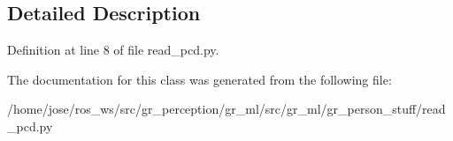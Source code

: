 \subsection{Detailed Description}


Definition at line 8 of file read\+\_\+pcd.\+py.



The documentation for this class was generated from the following file\+:\begin{DoxyCompactItemize}
\item 
/home/jose/ros\+\_\+ws/src/gr\+\_\+perception/gr\+\_\+ml/src/gr\+\_\+ml/gr\+\_\+person\+\_\+stuff/read\+\_\+pcd.\+py\end{DoxyCompactItemize}
